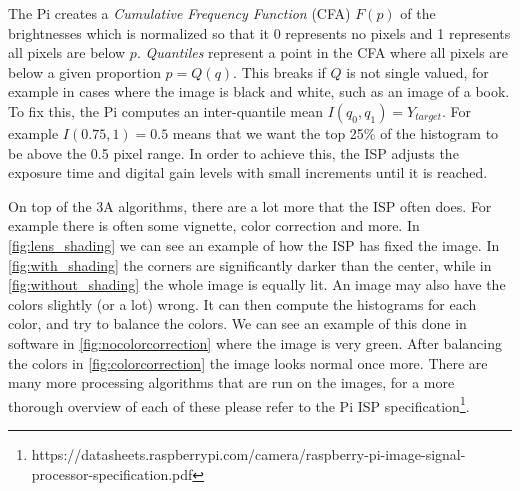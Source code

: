 The Pi creates a \textit{Cumulative Frequency Function} (CFA) $F(p)$ of the brightnesses which
is normalized so that it 0 represents no pixels and 1 represents all pixels are
below $p$. \textit{Quantiles} represent a point in the CFA where all pixels are
below a given proportion $p = Q(q)$. This breaks if $Q$ is not single valued,
for example in cases where the image is black and white, such as an image of
a book. To fix this, the Pi computes an inter-quantile mean
$I(q_0, q_1) = Y_{target}$. For example $I(0.75, 1) = 0.5$ means that we want
the top 25\% of the histogram to be above the 0.5 pixel range. In order to
achieve this, the ISP adjusts the exposure time and digital gain levels with
small increments until it is reached.

On top of the 3A algorithms, there are a lot more that the ISP often does. For
example there is often some vignette, color correction and more. In
\cref{fig:lens_shading} we can see an example of how the ISP has fixed the image.
In \cref{fig:with_shading} the corners are significantly darker than the center,
while in \cref{fig:without_shading} the whole image is equally lit. An image
may also have the colors slightly (or a lot) wrong. It can then compute the
histograms for each color, and try to balance the colors. We can see an example
of this done in software in \cref{fig:nocolorcorrection} where the image is
very green. After balancing the colors in \cref{fig:colorcorrection} the image
looks normal once more. There are many more processing algorithms that are run
on the images, for a more thorough overview of each of these please refer to
the Pi ISP specification\footnote{https://datasheets.raspberrypi.com/camera/raspberry-pi-image-signal-processor-specification.pdf}.

